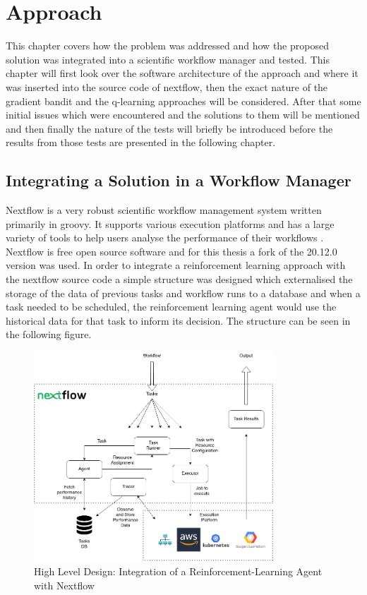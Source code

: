 
\cleardoublepage
\chapter{Approach}
\label{cha:approach}


This chapter covers how the problem was addressed and how the proposed solution was integrated into a scientific workflow manager and tested. This chapter will first look over the software architecture of the approach and where it was inserted into the source code of nextflow, then the exact nature of the gradient bandit and the q-learning approaches will be considered. After that some initial issues which were encountered and the solutions to them will be mentioned and then finally the nature of the tests will briefly be introduced before the results from those tests are presented in the following chapter. 

\section{Integrating a Solution in a Workflow Manager}
\label{sec:integration}

Nextflow is a very robust scientific  workflow management system written primarily in groovy. It supports various execution platforms and has a large variety of tools to help users analyse the performance of their workflows \cite{TracingAndVisualisation}. Nextflow is free open source software and for this thesis a fork of the 20.12.0 version was used. In order to integrate a reinforcement learning approach with the nextflow source code a simple structure was designed which externalised the storage of the data of previous tasks and workflow runs to a database and when a task needed to be scheduled, the reinforcement learning agent would use the historical data for that task to inform its decision. The structure can be seen in the following figure.

\begin{figure}[ht]
    \centering
        \includegraphics[width=0.8\textwidth]{fig/implementation_diagram.png}
        \caption{High Level Design: Integration of a Reinforcement-Learning Agent with Nextflow}
        \label{fig:implementation}
\end{figure}

